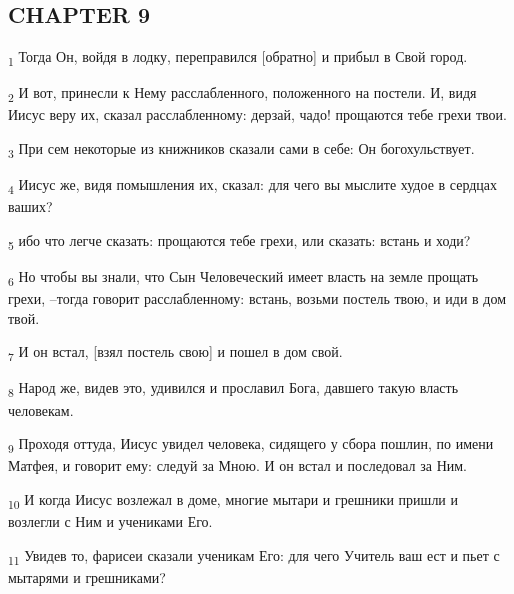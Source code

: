 \subsection{CHAPTER 9}
\begin{tcolorbox}
\textsubscript{1} Тогда Он, войдя в лодку, переправился [обратно] и прибыл в Свой город.
\end{tcolorbox}
\begin{tcolorbox}
\textsubscript{2} И вот, принесли к Нему расслабленного, положенного на постели. И, видя Иисус веру их, сказал расслабленному: дерзай, чадо! прощаются тебе грехи твои.
\end{tcolorbox}
\begin{tcolorbox}
\textsubscript{3} При сем некоторые из книжников сказали сами в себе: Он богохульствует.
\end{tcolorbox}
\begin{tcolorbox}
\textsubscript{4} Иисус же, видя помышления их, сказал: для чего вы мыслите худое в сердцах ваших?
\end{tcolorbox}
\begin{tcolorbox}
\textsubscript{5} ибо что легче сказать: прощаются тебе грехи, или сказать: встань и ходи?
\end{tcolorbox}
\begin{tcolorbox}
\textsubscript{6} Но чтобы вы знали, что Сын Человеческий имеет власть на земле прощать грехи, --тогда говорит расслабленному: встань, возьми постель твою, и иди в дом твой.
\end{tcolorbox}
\begin{tcolorbox}
\textsubscript{7} И он встал, [взял постель свою] и пошел в дом свой.
\end{tcolorbox}
\begin{tcolorbox}
\textsubscript{8} Народ же, видев это, удивился и прославил Бога, давшего такую власть человекам.
\end{tcolorbox}
\begin{tcolorbox}
\textsubscript{9} Проходя оттуда, Иисус увидел человека, сидящего у сбора пошлин, по имени Матфея, и говорит ему: следуй за Мною. И он встал и последовал за Ним.
\end{tcolorbox}
\begin{tcolorbox}
\textsubscript{10} И когда Иисус возлежал в доме, многие мытари и грешники пришли и возлегли с Ним и учениками Его.
\end{tcolorbox}
\begin{tcolorbox}
\textsubscript{11} Увидев то, фарисеи сказали ученикам Его: для чего Учитель ваш ест и пьет с мытарями и грешниками?
\end{tcolorbox}
